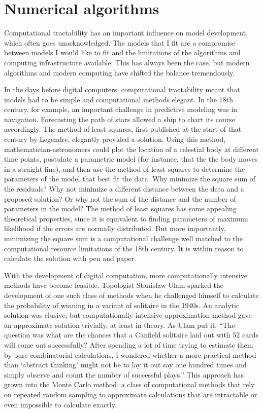 \chapter{Numerical algorithms}
\label{numerical-algorithms}

Computational tractability has an important influence on model
development, which often goes unacknowledged. The models that I fit
are a compromise between models I would like to fit and the
limitations of the algorithms and computing infrastructure
available. This has always been the case, but modern algorithms and
modern computing have shifted the balance tremendously.

In the days before digital computers, computational tractability meant
that models had to be simple and computational methods elegant. In the
18th century, for example, an important challenge in predictive
modeling was in navigation.\cite{williams_sails_1993} Forecasting the
path of stars allowed a ship to chart its course accordingly. The
method of least squares, first published at the start of that century
by Legendre, elegantly provided a
solution.\cite{legendre_nouvelles_2011} Using this method,
mathematician-astronomers could plot the location of a celestial body
at different time points, postulate a parametric model (for instance,
that the the body moves in a straight line), and then use the method
of least squares to determine the parameters of the model that best
fit the data.  Why minimize the square sum of the residuals?  Why not
minimize a different distance between the data and a proposed
solution? Or why not the sum of the distance and the number of
parameters in the model? The method of least squares has some
appealing theoretical properties, since it is equivalent to finding
parameters of maximum likelihood if the errors are normally
distributed. But more importantly, minimizing the square sum is a
computational challenge well matched to the computational resource
limitations of the 18th century.  It is within reason to calculate the
solution with pen and paper.

With the development of digital computation, more computationally
intensive methods have become feasible. Topologist Stanislaw Ulam
sparked the development of one such class of methods when he
challenged himself to calculate the probability of winning in a
variant of solitaire in the 1940s. An analytic solution was elusive,
but computationally intensive approximation method gave an approximate
solution trivially, at least in theory. As Ulam put it, ``The question
was what are the chances that a Canfield solitaire laid out with 52
cards will come out successfully?  After spending a lot of time trying
to estimate them by pure combinatorial calculations, I wondered
whether a more practical method than `abstract thinking' might not be
to lay it out say one hundred times and simply observe and count the
number of successful plays.''  This approach has grown into the Monte
Carlo method, a class of computational methods that rely on repeated
random sampling to approximate calculations that are intractable or
even impossible to calculate exactly.\cite{eckhardt_stan_1987}


